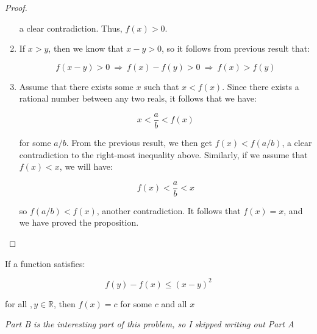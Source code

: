\documentclass[10pt, oneside]{amsart}
\newenvironment{problem}[2][Problem]{\begin{trivlist}
\item[\hskip \labelsep {\bfseries #1}\hskip \labelsep {\bfseries #2.}]}{\end{trivlist}}
\begin{document}
\begin{proof}
\begin{enumerate}
        \noindent
        a clear contradiction. Thus, $f(x) > 0$.

        \vspace{8pt}

      \item If $x > y$, then we know that $x - y > 0$, so it follows from previous result that:

        $$f(x - y) > 0 \ \Rightarrow \ f(x) - f(y) > 0 \ \Rightarrow \ f(x) > f(y)$$

      \item Assume that there exists some $x$ such that $x < f(x)$. Since there exists a rational number between any two reals, it follows that we have:

        $$x < \frac{a}{b} < f(x)$$

        \noindent
        for some $a/b$. From the previous result, we then get $f(x) < f(a/b)$, a clear contradiction to the right-most inequality above. Similarly, if we assume
        that $f(x) < x$, we will have:

        $$f(x) < \frac{a}{b} < x$$

        \noindent
        so $f(a/b) < f(x)$, another contradiction. It follows that $f(x) = x$, and we have proved the proposition.

        \end{enumerate}
    \end{proof}

    \begin{problem}{3.20B}
      If a function satisfies:

      $$f(y) - f(x) \leq (x - y)^2$$

      for all $, y \in \mathbb{R}$, then $f(x) = c$ for some $c$ and all $x$
    \end{problem}

    \textit{Part B is the interesting part of this problem, so I skipped writing out Part A}
\end{document}
